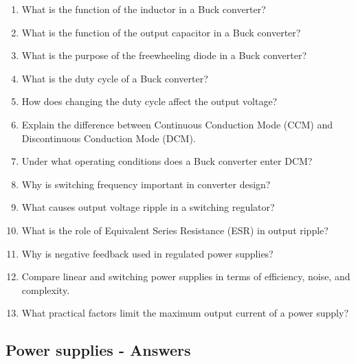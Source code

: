 \documentclass[../main.tex]{subfiles}
\begin{document}
\begin{enumerate}[label=\textbf{\arabic*.}]
	\item What is the function of the inductor in a Buck converter?
	\item What is the function of the output capacitor in a Buck converter?
	\item What is the purpose of the freewheeling diode in a Buck converter?
	\item What is the duty cycle of a Buck converter?
	\item How does changing the duty cycle affect the output voltage?
	\item Explain the difference between Continuous Conduction Mode (CCM) and Discontinuous Conduction Mode (DCM).
	\item Under what operating conditions does a Buck converter enter DCM?
	\item Why is switching frequency important in converter design?
	\item What causes output voltage ripple in a switching regulator?
	\item What is the role of Equivalent Series Resistance (ESR) in output ripple?
	\item Why is negative feedback used in regulated power supplies?
	\item Compare linear and switching power supplies in terms of efficiency, noise, and complexity.
	\item What practical factors limit the maximum output current of a power supply?
\end{enumerate}





\subsection{Power supplies - Answers}
\end{document}
